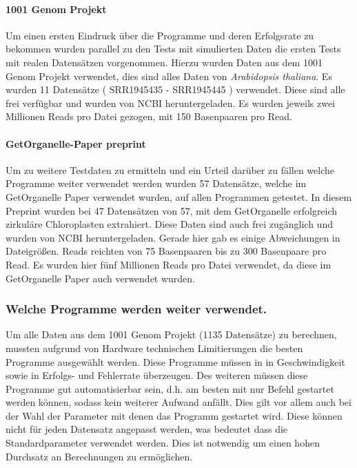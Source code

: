 \documentclass{scrartcl}
\begin{document}
\paragraph{1001 Genom Projekt}
\label{sec-3-1-1-2}
Um einen ersten Eindruck über die Programme und deren Erfolgsrate zu bekommen wurden parallel zu den Tests mit simulierten Daten die ersten Tests mit realen Datensätzen vorgenommen. 
Hierzu wurden Daten aus dem 1001 Genom Projekt\footnotemark[44]{} verwendet, dies sind alles Daten von \emph{Arabidopsis thaliana}. Es wurden 11 Datensätze ( SRR1945435 - SRR1945445 ) verwendet. Diese sind alle
frei verfügbar und wurden von NCBI\footnotemark[36]{} heruntergeladen. Es wurden jeweils zwei Millionen Reads pro Datei gezogen, mit 150 Basenpaaren pro Read. 

\paragraph{GetOrganelle-Paper preprint}
\label{sec-3-1-1-3}
Um zu weitere Testdaten zu ermitteln und ein Urteil darüber zu fällen welche Programme weiter verwendet werden
wurden 57 Datensätze, welche im GetOrganelle Paper \footnotemark[30]{} verwendet wurden,
auf allen Programmen getestet. In diesem Preprint wurden bei 47 Datensätzen von 57, mit
dem GetOrganelle erfolgreich zirkuläre Chloroplasten extrahiert. Diese Daten sind auch frei zugänglich und wurden
von NCBI heruntergeladen. Gerade hier gab es einige Abweichungen in Dateigrößen. Reads reichten von 75 Basenpaaren 
bis zu 300 Basenpaare pro Read. Es wurden hier fünf Millionen Reads pro Datei verwendet, da diese im GetOrganelle Paper
auch verwendet wurden.

\subsubsection{Welche Programme werden weiter verwendet.}
\label{sec-3-1-2}
Um alle Daten aus dem 1001 Genom Projekt (1135 Datensätze) zu berechnen, mussten aufgrund 
von Hardware technischen Limitierungen die besten Programme ausgewählt werden. Diese Programme müssen in
in Geschwindigkeit sowie in Erfolgs- und Fehlerrate überzeugen. Des weiteren müssen diese Programme gut automatisierbar sein, 
d.h. am besten mit nur Befehl gestartet werden können, sodass kein weiterer Aufwand anfällt. Dies gilt
vor allem auch bei der Wahl der Parameter mit denen das Programm gestartet wird. Diese können nicht 
für jeden Datensatz angepasst werden, was bedeutet dass die Standardparameter verwendet werden.
Dies ist notwendig um einen hohen Durchsatz an Berechnungen zu ermöglichen.
\end{document}
